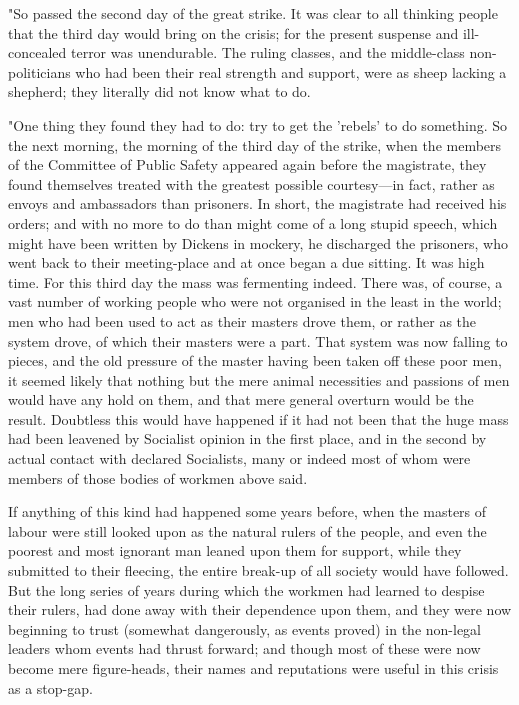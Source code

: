 "So passed the second day of the great strike. It was clear to all
thinking people that the third day would bring on the crisis; for the
present suspense and ill-concealed terror was unendurable. The ruling
classes, and the middle-class non-politicians who had been their real
strength and support, were as sheep lacking a shepherd; they literally
did not know what to do.

"One thing they found they had to do: try to get the 'rebels' to do
something. So the next morning, the morning of the third day of the
strike, when the members of the Committee of Public Safety appeared
again before the magistrate, they found themselves treated with the
greatest possible courtesy---in fact, rather as envoys and ambassadors
than prisoners. In short, the magistrate had received his orders; and
with no more to do than might come of a long stupid speech, which might
have been written by Dickens in mockery, he discharged the prisoners,
who went back to their meeting-place and at once began a due sitting. It
was high time. For this third day the mass was fermenting indeed. There
was, of course, a vast number of working people who were not organised
in the least in the world; men who had been used to act as their masters
drove them, or rather as the system drove, of which their masters were a
part. That system was now falling to pieces, and the old pressure of the
master having been taken off these poor men, it seemed likely that
nothing but the mere animal necessities and passions of men would have
any hold on them, and that mere general overturn would be the result.
Doubtless this would have happened if it had not been that the huge mass
had been leavened by Socialist opinion in the first place, and in the
second by actual contact with declared Socialists, many or indeed most
of whom were members of those bodies of workmen above said.

If anything of this kind had happened some years before, when the
masters of labour were still looked upon as the natural rulers of the
people, and even the poorest and most ignorant man leaned upon them for
support, while they submitted to their fleecing, the entire break-up of
all society would have followed. But the long series of years during
which the workmen had learned to despise their rulers, had done away
with their dependence upon them, and they were now beginning to trust
(somewhat dangerously, as events proved) in the non-legal leaders whom
events had thrust forward; and though most of these were now become mere
figure-heads, their names and reputations were useful in this crisis as
a stop-gap.

